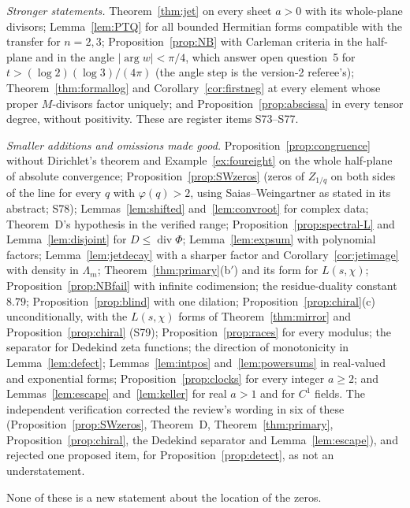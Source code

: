 \emph{Stronger statements.} Theorem~\ref{thm:jet} on every sheet $a>0$ with its whole-plane divisors; Lemma~\ref{lem:PTQ} for all bounded Hermitian forms compatible with the transfer for $n=2,3$; Proposition~\ref{prop:NB} with Carleman criteria in the half-plane and in the angle $|\arg w|<\pi/4$, which answer open question~5 for $t>(\log2)(\log3)/(4\pi)$ (the angle step is the version-2 referee's); Theorem~\ref{thm:formallog} and Corollary~\ref{cor:firstneg} at every element whose proper $M$-divisors factor uniquely; and Proposition~\ref{prop:abscissa} in every tensor degree, without positivity. These are register items S73--S77.

\emph{Smaller additions and omissions made good.} Proposition~\ref{prop:congruence} without Dirichlet's theorem and Example~\ref{ex:foureight} on the whole half-plane of absolute convergence; Proposition~\ref{prop:SWzeros} (zeros of $Z_{1/q}$ on both sides of the line for every $q$ with $\varphi(q)>2$, using Saias--Weingartner as stated in its abstract; S78); Lemmas~\ref{lem:shifted} and~\ref{lem:convroot} for complex data; Theorem~D's hypothesis in the verified range; Proposition~\ref{prop:spectral-L} and Lemma~\ref{lem:disjoint} for $D\le\operatorname{div}\Phi$; Lemma~\ref{lem:expsum} with polynomial factors; Lemma~\ref{lem:jetdecay} with a sharper factor and Corollary~\ref{cor:jetimage} with density in $\Lambda_m$; Theorem~\ref{thm:primary}(b$'$) and its form for $L(s,\chi)$; Proposition~\ref{prop:NBfail} with infinite codimension; the residue-duality constant $8.79$; Proposition~\ref{prop:blind} with one dilation; Proposition~\ref{prop:chiral}(c) unconditionally, with the $L(s,\chi)$ forms of Theorem~\ref{thm:mirror} and Proposition~\ref{prop:chiral} (S79); Proposition~\ref{prop:races} for every modulus; the separator for Dedekind zeta functions; the direction of monotonicity in Lemma~\ref{lem:defect}; Lemmas~\ref{lem:intpos} and~\ref{lem:powersums} in real-valued and exponential forms; Proposition~\ref{prop:clocks} for every integer $a\ge2$; and Lemmas~\ref{lem:escape} and~\ref{lem:keller} for real $a>1$ and for $C^1$ fields. The independent verification corrected the review's wording in six of these (Proposition~\ref{prop:SWzeros}, Theorem~D, Theorem~\ref{thm:primary}, Proposition~\ref{prop:chiral}, the Dedekind separator and Lemma~\ref{lem:escape}), and rejected one proposed item, for Proposition~\ref{prop:detect}, as not an understatement.

None of these is a new statement about the location of the zeros.

